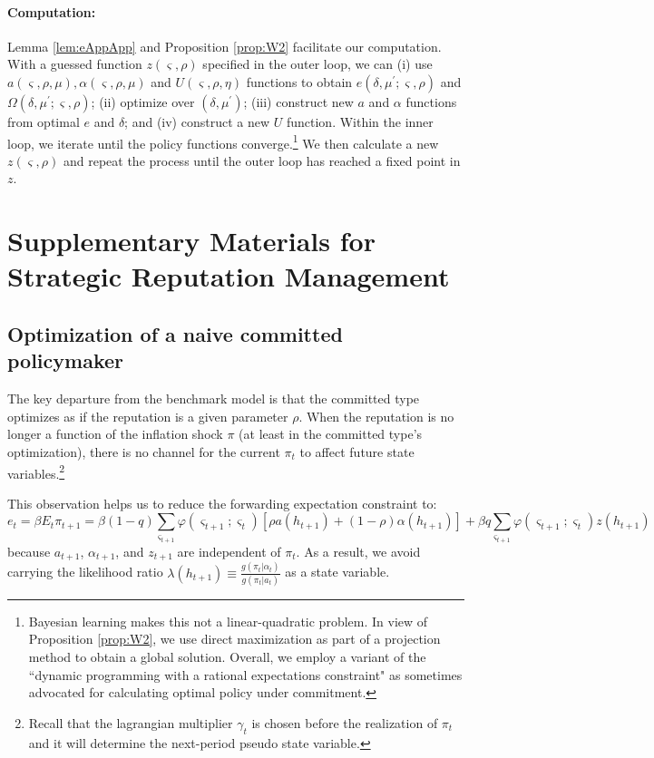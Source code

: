\documentclass[12pt,letter,leqno]{article}
\theoremstyle{asn}
\theoremstyle{lem}
\theoremstyle{slem}
\theoremstyle{prop}
\theoremstyle{appprop}
\theoremstyle{rem}
\theoremstyle{defn}
\begin{document}
\paragraph{Computation:} Lemma \ref{lem:eAppApp} and Proposition \ref{prop:W2} facilitate our computation. With a guessed function $z\left(
\varsigma ,\rho \right) $ specified in the outer loop, we can (i) use $a(\varsigma ,\rho ,\mu ),\alpha (\varsigma ,\rho
,\mu )$ and $U(\varsigma,\rho,\eta)$ functions to obtain $e(\delta ,\mu ^{\prime };\varsigma ,\rho )$ and $\Omega(\delta,\mu^{\prime};\varsigma, \rho)$; (ii) optimize over $(\delta ,\mu ^{\prime })$; (iii) construct new $a$ and $\alpha$ functions from optimal $e$ and $\delta$; and (iv) construct a new $U$ function. Within the inner loop, we iterate until the policy functions converge.\footnote{Bayesian learning makes this not a linear-quadratic problem. In view of Proposition \ref{prop:W2}, we use direct maximization as part of a projection method to obtain a global solution. Overall, we employ a variant of the ``dynamic programming with a rational expectations constraint" as sometimes advocated for calculating optimal policy under commitment.}
We then calculate a new $z(\varsigma,\rho)$ and repeat the process until the outer loop has reached a fixed point in $z$.

\section{Supplementary Materials for Strategic Reputation Management}

\subsection{Optimization of a naive committed policymaker}\label{app:counter}
The key departure from the benchmark model is that the committed type
optimizes as if the reputation is a given parameter $\rho $. When the
reputation is no longer a function of the inflation shock $\pi $ (at least
in the committed type's optimization), there is no channel for the current $%
\pi _{t}$ to affect future state variables.\footnote{Recall that the lagrangian
multiplier $\gamma _{t}$ is chosen before the realization of $\pi _{t}$ and
it will determine the next-period pseudo state variable.}

This observation helps us to reduce the forwarding expectation constraint
to:  
\[
e_{t}=\beta E_{t}\pi _{t+1}=\beta \left( 1-q\right) \sum_{\varsigma
_{t+1}}\varphi \left( \varsigma _{t+1};\varsigma _{t}\right) \left[ \rho
a\left( h_{t+1}\right) +\left( 1-\rho \right) \alpha \left( h_{t+1}\right) %
\right] +\beta q\sum_{\varsigma _{t+1}}\varphi \left( \varsigma
_{t+1};\varsigma _{t}\right) z\left( h_{t+1}\right) 
\]%
because $a_{t+1}$, $\alpha _{t+1}$, and $z_{t+1}$  are independent of $\pi
_{t}$. As a result, we avoid carrying the likelihood ratio $\lambda \left(
h_{t+1}\right) \equiv\frac{g\left( \pi _{t}|\alpha _{t}\right) }{g\left( \pi
_{t}|a_{t}\right) }$ as a state variable.
\end{document}
